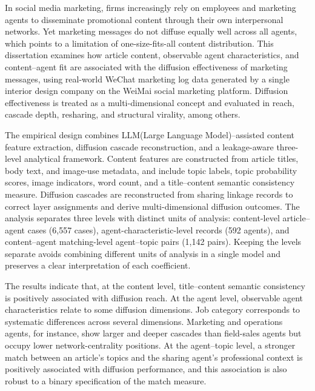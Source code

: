 \clearpage
\thispagestyle{empty}

In social media marketing, firms increasingly rely on employees and marketing agents to disseminate promotional content through their own interpersonal networks. Yet marketing messages do not diffuse equally well across all agents, which points to a limitation of one-size-fits-all content distribution. This dissertation examines how article content, observable agent characteristics, and content–agent fit are associated with the diffusion effectiveness of marketing messages, using real-world WeChat marketing log data generated by a single interior design company on the WeiMai social marketing platform. Diffusion effectiveness is treated as a multi-dimensional concept and evaluated in reach, cascade depth, resharing, and structural virality, among others.

The empirical design combines LLM(Large Language Model)–assisted content feature extraction, diffusion cascade reconstruction, and a leakage-aware three-level analytical framework. Content features are constructed from article titles, body text, and image-use metadata, and include topic labels, topic probability scores, image indicators, word count, and a title–content semantic consistency measure. Diffusion cascades are reconstructed from sharing linkage records to correct layer assignments and derive multi-dimensional diffusion outcomes. The analysis separates three levels with distinct units of analysis: content-level article–agent cases (6,557 cases), agent-characteristic-level records (592 agents), and content–agent matching-level agent–topic pairs (1,142 pairs). Keeping the levels separate avoids combining different units of analysis in a single model and preserves a clear interpretation of each coefficient.

The results indicate that, at the content level, title–content semantic consistency is positively associated with diffusion reach. At the agent level, observable agent characteristics relate to some diffusion dimensions. Job category corresponds to systematic differences across several dimensions. Marketing and operations agents, for instance, show larger and deeper cascades than field-sales agents but occupy lower network-centrality positions. At the agent–topic level, a stronger match between an article's topics and the sharing agent's professional context is positively associated with diffusion performance, and this association is also robust to a binary specification of the match measure.

